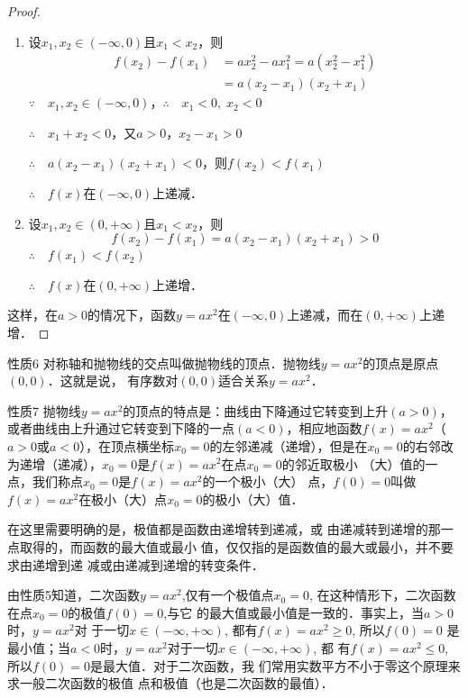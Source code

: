 \begin{proof}
\begin{enumerate}
    \item 设$x_1,x_2\in(-\infty,0)$且$x_1<x_2$，则
    \[\begin{split}
        f(x_2)-f(x_1)&=ax^2_2-ax^2_1=a(x^2_2-x^2_1)\\
&=a(x_2-x_1)(x_2+x_1)
    \end{split}\]
$\because \quad x_1,x_2\in(-\infty,0)$，$\therefore\quad x_1<0,\; x_2<0$

$\therefore\quad x_1+x_2<0$，又$a>0$，$x_2-x_1>0$

$\therefore\quad a(x_2-x_1)(x_2+x_1)<0$，则$f(x_2)<f(x_1)$

$\therefore\quad f(x)$在$(-\infty,0)$上递减．

    \item 设$x_1,x_2\in(0,+\infty)$且$x_1<x_2$，则
    \[f(x_2)-f(x_1)=a(x_2-x_1)(x_2+x_1)>0\]
    $\therefore\quad f(x_1)<f(x_2)$

$\therefore\quad f(x)$在$(0,+\infty)$上递增．
\end{enumerate} 

这样，在$a>0$的情况下，函数$y=ax^2$在$(-\infty,0)$上递减，而在$(0,+\infty)$上递增．
\end{proof}

\begin{blk}{性质6}
对称轴和抛物线的交点叫做抛物线的顶点．抛物线$y=ax^2$的顶点是原点$(0,0)$．这就是说，
有序数对$(0,0)$适合关系$y=ax^2$．
\end{blk}

\begin{blk}{性质7}
    抛物线$y=ax^2$的顶点的特点是：曲线由下降通过它转变到上升$(a>0)$，或者曲线由上升通过它转变到下降的一点$(a<0)$，相应地函数$f(x)=ax^2$（$a>0$或$a<0$），在顶点横坐标$x_0=0$的左邻递减（递增），但是在$x_0=0$的右邻改为递增（递减），$x_0=0$是$f(x)=ax^2$在点$x_0=0$的邻近取极小
    （大）值的一点，我们称点$x_0=0$是$f(x)=ax^2$的一个极小（大）
    点，$f(0)=0$叫做$f(x)=ax^2$在极小（大）点$x_0=0$的极小（大）值．
\end{blk}



    在这里需要明确的是，极值都是函数由递增转到递减，或
    由递减转到递增的那一点取得的，而函数的最大值或最小
    值，仅仅指的是函数值的最大或最小，并不要求由递增到递
    减或由递减到递增的转变条件．

    由性质5知道，二次函数$y=ax^2$,仅有一个极值点$x_0=0$,
    在这种情形下，二次函数在点$x_0=0$的极值$f(0)=0$,与它
    的最大值或最小值是一致的．事实上，当$a>0$时，$y=ax^2$对
    于一切$x\in(-\infty,+\infty)$, 都有$f(x)=ax^2\ge 0$, 所以$f(0)=0$
    是最小值；当$a<0$时，$y=ax^2$对于一切$x\in(-\infty,+\infty)$, 都
    有$f(x)=ax^2\le 0$, 所以$f(0)=0$是最大值．对于二次函数，我
    们常用实数平方不小于零这个原理来求一般二次函数的极值
    点和极值（也是二次函数的最值）．

